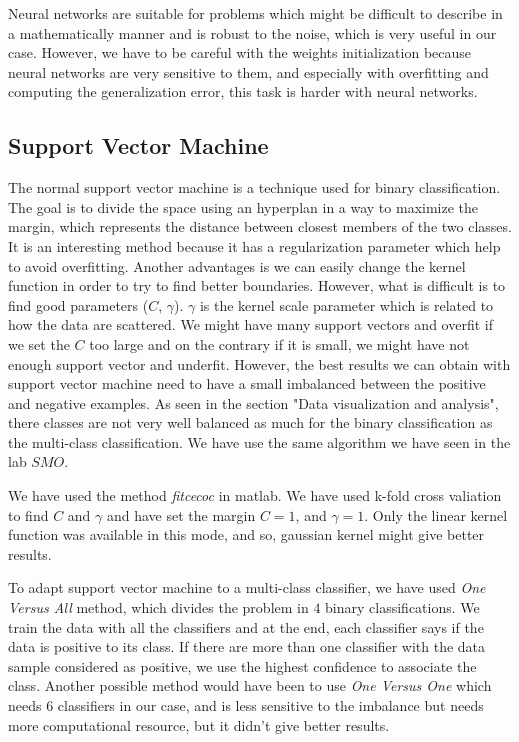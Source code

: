 \documentclass{article} %
\begin{document}
Neural networks are suitable for problems which might be difficult to describe in a mathematically manner and is robust to the noise, which is very useful in our case. However, we have to be careful with the weights initialization because neural networks are very sensitive to them, and especially with overfitting and computing the generalization error, this task is harder with neural networks.

\subsection{Support Vector Machine}

The normal support vector machine is a technique used for binary classification. The goal is to divide the space using an hyperplan in a way to maximize the margin, which represents the distance between closest members of the two classes. It is an interesting method because it has a regularization parameter which help to avoid overfitting. Another advantages is we can easily change the kernel function in order to try to find better boundaries. However, what is difficult is to find good parameters ($C$, $\gamma$). $\gamma$ is the kernel scale parameter which is related to how the data are scattered. We might have many support vectors and overfit if we set the $C$ too large and on the contrary if it is small, we might have not enough support vector and underfit. However, the best results we can obtain with support vector machine need to have a small imbalanced between the positive and negative examples. As seen in the section "Data visualization and analysis", there classes are not very well balanced as much for the binary classification as the multi-class classification. We have use the same algorithm we have seen in the lab $SMO$. 

We have used the method \textit{fitcecoc} in matlab. We have used k-fold cross valiation to find $C$ and $\gamma$ and have set the margin $C=1$, and $\gamma = 1$. Only the linear kernel function was available in this mode, and so, gaussian kernel might give better results.

To adapt support vector machine to a multi-class classifier, we have used \textit{One Versus All} method, which divides the problem in $4$ binary classifications. We train the data with all the classifiers and at the end, each classifier says if the data is positive to its class. If there are more than one classifier with the data sample considered as positive, we use the highest confidence to associate the class. Another possible method would have been to use \textit{One Versus One} which needs $6$ classifiers in our case, and is less sensitive to the imbalance but needs more computational resource, but it didn't give better results. 
\end{document}

